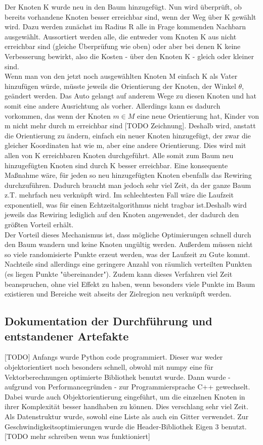 Der Knoten K wurde neu in den Baum hinzugefügt. Nun wird überprüft, ob bereits vorhandene Knoten besser erreichbar sind, wenn der Weg über K gewählt wird.
Dazu werden zunächst im Radius R alle in Frage kommenden Nachbarn ausgewählt. Aussortiert werden alle, die entweder vom Knoten K aus nicht erreichbar sind (gleiche Überprüfung wie oben) oder aber bei denen K keine Verbesserung bewirkt, also die Kosten - über den Knoten K - gleich oder kleiner sind. \\
Wenn man von den jetzt noch ausgewählten Knoten M einfach K als Vater hinzufügen würde, müsste jeweils die Orientierung der Knoten, der Winkel $\theta$, geändert werden. Das Auto gelangt auf anderem Wege zu diesen Knoten und hat somit eine andere Ausrichtung als vorher. Allerdings kann es dadurch vorkommen, das wenn der Knoten $m \in M$ eine neue Orientierung hat, Kinder von m nicht mehr durch m erreichbar sind [TODO Zeichnung]. Deshalb wird, anstatt die Orientierung zu ändern, einfach ein neuer Knoten hinzugefügt, der zwar die gleicher Koordinaten hat wie m, aber eine andere Orientierung. Dies wird mit allen von K erreichbaren Knoten durchgeführt. Alle somit zum Baum neu hinzugefügten Knoten sind durch K besser erreichbar. Eine konsequente Maßnahme wäre, für jeden so neu hinzugefügten Knoten ebenfalls das Rewiring durchzuführen. Dadurch braucht man jedoch sehr viel Zeit, da der ganze Baum z.T. mehrfach neu verknüpft wird. Im schlechtesten Fall wäre die Laufzeit exponentiell, was für einen Echtzeitalgorithmus nicht tragbar ist.Deshalb wird jeweils das Rewiring lediglich auf den Knoten angewendet, der dadurch den größten Vorteil erhält. \\
Der Vorteil dieses Mechanismus ist, dass mögliche Optimierungen schnell durch den Baum wandern und keine Knoten ungültig werden. Außerdem müssen nicht so viele randomisierte Punkte erzeut werden, was der Laufzeit zu Gute kommt. Nachteile sind allerdings eine geringere Anzahl von räumlich verteilten Punkten (es liegen Punkte "übereinander"). Zudem kann dieses Verfahren viel Zeit beanspruchen, ohne viel Effekt zu haben, wenn besonders viele Punkte im Baum existieren und Bereiche weit abseits der Zielregion neu verknüpft werden.





\subsection{Dokumentation der Durchführung und entstandener Artefakte}
[TODO] 
Anfangs wurde Python code programmiert. Dieser war weder objektorientiert noch besonders schnell, obwohl mit numpy eine für Vektorberechnungen optimierte Bibliothek benutzt wurde. Dann wurde - aufgrund von Performancegründen - zur Programmiersprache C++ gewechselt. Dabei wurde auch Objektorientierung eingeführt, um die einzelnen Knoten in ihrer Komplexität besser handhaben zu können. Dies verschlang sehr viel Zeit.\\
Als Datenstruktur wurde, sowohl eine Liste als auch ein Gitter verwendet. Zur Geschwindigkeitsoptimierungen wurde die Header-Bibliothek Eigen 3 benutzt. [TODO mehr schreiben wenn was funktioniert]
